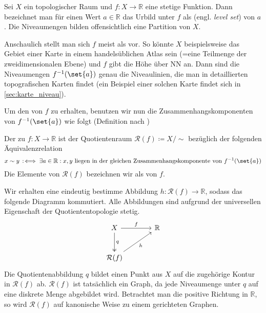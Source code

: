 Sei $X$ ein topologischer Raum und $f \colon X \to \mathbb{R}$ eine stetige Funktion.
Dann bezeichnet man für einen Wert $a \in \mathbb{R}$ das Urbild unter $f$ als  (engl. \emph{level set}) von $a$.
Die Niveaumengen bilden offensichtlich eine Partition von $X$.

Anschaulich stellt man sich $f$ meist als  vor. 
So könnte $X$ beispielsweise das Gebiet einer Karte in einem handelsüblichen Atlas sein (=eine Teilmenge der zweidimensionalen Ebene) und $f$ gibt die Höhe über NN an.
Dann sind die Niveaumengen $f^{-1}(\set{a})$ genau die Niveaulinien, die man in detaillierten topografischen Karten findet (ein Beispiel einer solchen Karte findet sich in \cref{sec:karte_niveau}).

Um den  von $f$ zu erhalten, benutzen wir nun die Zusammenhangskomponenten von $f^{-1}(\set{a})$ wie folgt (Definition nach \textcite[.4]{compTopo})

\begin{definition}[{name=[Reeb-Graph]}]
	Der  zu $f \colon X \to \mathbb{R}$ ist der Quotientenraum $\mathcal{R}(f) \coloneqq X/{\sim}$ bezüglich der folgenden Äquivalenzrelation
	\[
		x \sim y \,:\mkern-3mu\iff \exists a \in \mathbb{R} : x,y \text{ liegen in der gleichen Zusammenhangskomponente von } f^{-1}(\set{a}) 
	\]
	Die Elemente von $\mathcal{R}(f)$ bezeichnen wir als  von $f$.
\end{definition}
Wir erhalten eine eindeutig bestimme Abbildung $h \colon \mathcal{R}(f) \to \mathbb{R}$, sodass das folgende Diagramm kommutiert.
Alle Abbildungen sind aufgrund der universellen Eigenschaft der Quotiententopologie stetig.
\[
	\begin{tikzcd}[sep=large]
		X \rar["f"] \dar["q",two heads] & \mathbb{R} \\
		\mathcal{R}(f) \urar["h"']
	\end{tikzcd}
\]
Die Quotientenabbildung $q$ bildet einen Punkt aus $X$ auf die zugehörige Kontur in $\mathcal{R}(f)$ ab.
$\mathcal{R}(f)$ ist tatsächlich ein Graph, da jede Niveaumenge unter $q$ auf eine diskrete Menge abgebildet wird.
Betrachtet man die positive Richtung in $\mathbb{R}$, so wird $\mathcal{R}(f)$ auf kanonische Weise zu einem gerichteten Graphen.

